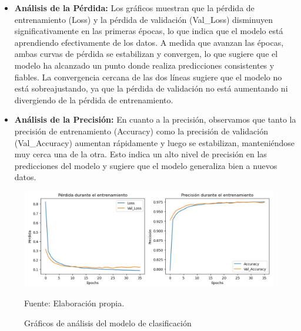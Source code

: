 \begin{itemize}
    \item \textbf{Análisis de la Pérdida:} Los gráficos muestran que la pérdida de entrenamiento (Loss) y la pérdida de validación (Val\_Loss) disminuyen significativamente en las primeras épocas, lo que indica que el modelo está aprendiendo efectivamente de los datos. A medida que avanzan las épocas, ambas curvas de pérdida se estabilizan y convergen, lo que sugiere que el modelo ha alcanzado un punto donde realiza predicciones consistentes y fiables. La convergencia cercana de las dos líneas sugiere que el modelo no está sobreajustando, ya que la pérdida de validación no está aumentando ni divergiendo de la pérdida de entrenamiento.
    \item \textbf{Análisis de la Precisión:} En cuanto a la precisión, observamos que tanto la precisión de entrenamiento (Accuracy) como la precisión de validación (Val\_Accuracy) aumentan rápidamente y luego se estabilizan, manteniéndose muy cerca una de la otra. Esto indica un alto nivel de precisión en las predicciones del modelo y sugiere que el modelo generaliza bien a nuevos datos.
\end{itemize}

\begin{figure}[H]
    \begin{minipage}[t]{0.9\textwidth}
        \caption{Gráficos de análisis del modelo de clasificación}
        \label{gráfico_clasificación}        
    \end{minipage}

    \vspace{10pt}

    \begin{minipage}[b]{1\textwidth}
        \centering
        \includegraphics[width=\textwidth]{img/Gráfico modelo clasificación.jpg}        
    \end{minipage}

    \begin{minipage}[t]{0.9\textwidth}
        Fuente: Elaboración propia.
    \end{minipage}
\end{figure}

